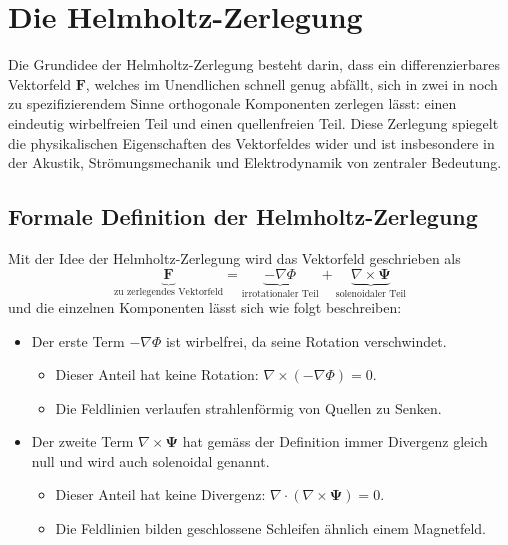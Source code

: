 %
%
%
%
\section{Die Helmholtz-Zerlegung
\label{helmholtz:section:Helmholtz_Zerlegung}}

Die Grundidee der Helmholtz-Zerlegung besteht darin, dass ein differenzierbares  Vektorfeld $\boldsymbol{F}$, welches im Unendlichen schnell genug abfällt, sich in zwei in noch zu spezifizierendem Sinne orthogonale Komponenten zerlegen lässt: einen eindeutig wirbelfreien Teil und einen quellenfreien Teil. Diese Zerlegung spiegelt die physikalischen Eigenschaften des Vektorfeldes wider und ist insbesondere in der Akustik, Strömungsmechanik und Elektrodynamik von zentraler Bedeutung.

\subsection{Formale Definition der Helmholtz-Zerlegung
\label{helmholtz:subsection:def_Helmholtz_Zerlegung}}

Mit der Idee der Helmholtz-Zerlegung wird das Vektorfeld geschrieben als
\begin{equation}
\underbrace{\boldsymbol{F}}_{\text{zu zerlegendes Vektorfeld}} = \underbrace{-\nabla \Phi}_{\text{irrotationaler Teil}} + \underbrace{\nabla \times \boldsymbol{\Psi}}_{\text{solenoidaler Teil}} 
\label{helmholtz:equationAllgemein}
\end{equation}
und die einzelnen Komponenten lässt sich wie folgt beschreiben:

\begin{itemize}
\item Der erste Term $ -\nabla \Phi $ ist wirbelfrei, da seine Rotation verschwindet.
\begin{itemize}
\item Dieser Anteil hat keine Rotation: $\nabla \times (-\nabla \Phi) = 0$.
\item Die Feldlinien verlaufen strahlenförmig von Quellen zu Senken.
\end{itemize}

\item Der zweite Term $\nabla \times \boldsymbol{\Psi}$ hat gemäss der Definition immer Divergenz gleich null und wird auch solenoidal genannt.
\begin{itemize}
\item Dieser Anteil hat keine Divergenz: $\nabla \cdot (\nabla \times \boldsymbol{\Psi}) = 0$.
\item Die Feldlinien bilden geschlossene Schleifen ähnlich einem Magnetfeld.
\end{itemize}
\end{itemize}

